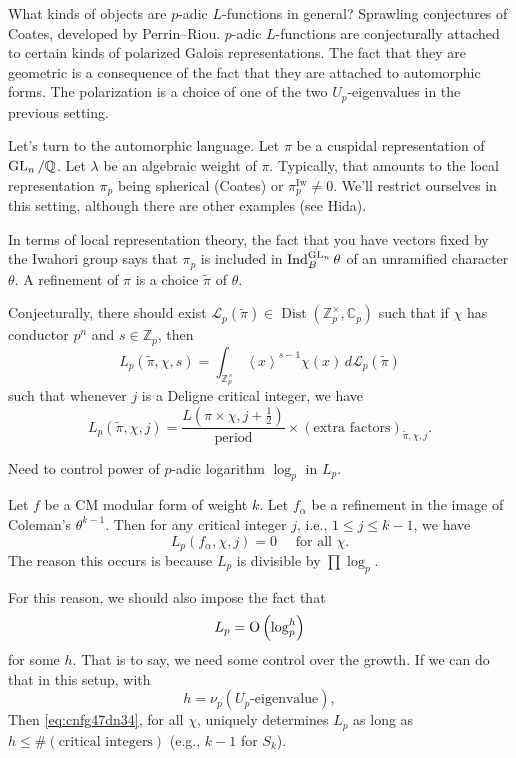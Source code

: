 \documentclass[reqno]{amsart} 
\begin{document}
What kinds of objects are $p$-adic $L$-functions in general?  Sprawling conjectures of Coates, developed by Perrin--Riou.  $p$-adic $L$-functions are conjecturally attached to certain kinds of polarized Galois representations.  The fact that they are geometric is a consequence of the fact that they are attached to automorphic forms.  The polarization is a choice of one of the two $U_p$-eigenvalues in the previous setting.

Let's turn to the automorphic language.  Let $\pi$ be a cuspidal representation of $\operatorname{GL}_n / \mathbb{Q}$.  Let $\lambda$ be an algebraic weight of $\pi$.  Typically, that amounts to the local representation $\pi_p$ being spherical (Coates) or $\pi_p^{\mathrm{Iw}} \neq 0$.  We'll restrict ourselves in this setting, although there are other examples (see Hida).

In terms of local representation theory, the fact that you have vectors fixed by the Iwahori group says that $\pi_p$ is included in $\operatorname{Ind}_B^{\operatorname{GL}_n} \theta$ of an unramified character $\theta$.  A refinement of $\pi$ is a choice $\tilde{\pi}$ of $\theta$.

Conjecturally, there should exist $\mathcal{L}_p(\tilde{\pi}) \in \operatorname{Dist}(\mathbb{Z}_p^\times, \mathbb{C}_p)$ such that if $\chi$ has conductor $p^n$ and $s \in \mathbb{Z}_p$, then
\begin{equation*}
  L_p(\tilde{\pi}, \chi, s) = \int_{\mathbb{Z}_p^\times}
  \left\langle x \right\rangle^{s - 1} \chi(x) \, d \mathcal{L}_p(\tilde{\pi})
\end{equation*}
such that whenever $j$ is a Deligne critical integer, we have
\begin{equation}\label{eq:cnfg47dn34}
  L_p(\tilde{\pi}, \chi, j) = \frac{L(\pi \times \chi, j + \tfrac{1}{2})}{\mathrm{period}}
  \times(\text{extra factors})_{\tilde{\pi}, \chi, j}.
\end{equation}
\begin{remark}
  Need to control power of $p$-adic logarithm $\log_p$ in $L_p$.
\end{remark}
\begin{example}
  Let $f$ be a CM modular form of weight $k$.  Let $f_\alpha$ be a refinement in the image of Coleman's $\theta^{k - 1}$.  Then for any critical integer $j$, i.e., $1 \leq j \leq k - 1$, we have
  \begin{equation*}
    L_p(f_\alpha, \chi, j) = 0 \quad \text{ for all } \chi.
  \end{equation*}
  The reason this occurs is because $L_p$ is divisible by $\prod \log_p$.
\end{example}
For this reason, we should also impose the fact that
\begin{equation*}
  L_p = \operatorname{O} \left( \log_p^h \right)
\end{equation*}
for some $h$.  That is to say, we need some control over the growth.  If we can do that in this setup, with
\begin{equation*}
  h = \nu_p \left( U_p \text{-eigenvalue} \right),
\end{equation*}
Then \eqref{eq:cnfg47dn34}, for all $\chi$, uniquely determines $L_p$ as long as $h \leq \# (\text{critical integers})$ (e.g., $k - 1$ for $S_k$).
\end{document}
